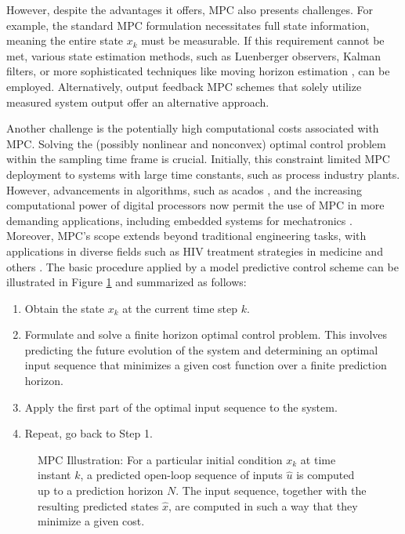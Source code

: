 However, despite the advantages it offers, MPC also presents challenges. For example, the standard MPC formulation necessitates full state information, meaning the entire state $x_k$ must be measurable. If this requirement cannot be met, various state estimation methods, such as Luenberger observers, Kalman filters, or more sophisticated techniques like moving horizon estimation \cite{rawlings2006particle}, can be employed. Alternatively, output feedback MPC schemes that solely utilize measured system output offer an alternative approach.

Another challenge is the potentially high computational costs associated with MPC. Solving the (possibly nonlinear and nonconvex) optimal control problem within the sampling time frame is crucial. Initially, this constraint limited MPC deployment to systems with large time constants, such as process industry plants. However, advancements in algorithms, such as acados \cite{verschueren2019acados}, and the increasing computational power of digital processors now permit the use of MPC in more demanding applications, including embedded systems for mechatronics \cite{zometa2012implementation}. Moreover, MPC's scope extends beyond traditional engineering tasks, with applications in diverse fields such as HIV treatment strategies in medicine \cite{hernandez2014switching} and others \cite{mayne2014model}. The basic procedure applied by a model predictive control scheme can be illustrated in Figure \ref{f:figure_mpc} and summarized as follows:

\begin{enumerate}
    \item Obtain the state $x_k$ at the current time step $k$.
    \item Formulate and solve a finite horizon optimal control problem. This involves predicting the future evolution of the system and determining an optimal input sequence that minimizes a given cost function over a finite prediction horizon.
    \item Apply the first part of the optimal input sequence to the system. 
    \item Repeat, go back to Step 1.
\end{enumerate}

 \begin{figure}[ht]		%
  \centering
  \caption{MPC Illustration: For a particular initial condition $x_k$ at time instant $k$, a predicted open-loop sequence of inputs $\hat{u}$ is computed up to a prediction horizon $N$. The input sequence, together with the resulting predicted states $\hat{x}$, are computed in such a way that they minimize a given cost\cite{maiworm2021gaussian}.}
  \label{f:figure_mpc}
\end{figure}

